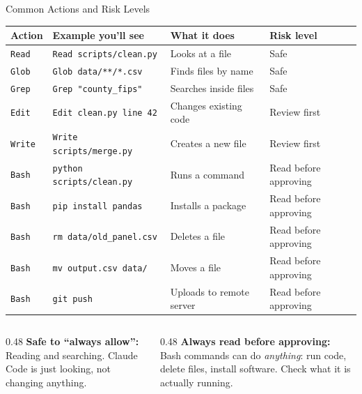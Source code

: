 \documentclass[aspectratio=169, 11pt]{beamer}
\begin{document}
\begin{frame}{Common Actions and Risk Levels}
  \scriptsize
  \begin{tabular*}{\textwidth}{@{\extracolsep{\fill}}llll@{}}
    \toprule
    \textbf{Action} & \textbf{Example you'll see} & \textbf{What it does} & \textbf{Risk level} \\
    \midrule
    \texttt{Read}      & \texttt{Read scripts/clean.py}           & Looks at a file          & \color{green!50!black} Safe \\
    \texttt{Glob}      & \texttt{Glob data/**/*.csv}              & Finds files by name      & \color{green!50!black} Safe \\
    \texttt{Grep}      & \texttt{Grep "county\_fips"}             & Searches inside files    & \color{green!50!black} Safe \\
    \texttt{Edit}      & \texttt{Edit clean.py line 42}           & Changes existing code    & \color{yellow!50!black} Review first \\
    \texttt{Write}     & \texttt{Write scripts/merge.py}          & Creates a new file       & \color{yellow!50!black} Review first \\
    \texttt{Bash}      & \texttt{python scripts/clean.py}         & Runs a command           & \color{red!70!black} Read before approving \\
    \texttt{Bash}      & \texttt{pip install pandas}              & Installs a package       & \color{red!70!black} Read before approving \\
    \texttt{Bash}      & \texttt{rm data/old\_panel.csv}          & Deletes a file           & \color{red!70!black} Read before approving \\
    \texttt{Bash}      & \texttt{mv output.csv data/}             & Moves a file             & \color{red!70!black} Read before approving \\
    \texttt{Bash}      & \texttt{git push}                        & Uploads to remote server & \color{red!70!black} Read before approving \\
    \bottomrule
  \end{tabular*}

  \normalsize
  \vspace{0.5em}
  \begin{columns}[T]
    \begin{column}{0.48\textwidth}
      \textbf{\color{green!50!black} Safe to ``always allow'':}\\
      Reading and searching. Claude Code is just looking, not changing anything.
    \end{column}
    \begin{column}{0.48\textwidth}
      \textbf{\color{red!70!black} Always read before approving:}\\
      Bash commands can do \textit{anything}: run code, delete files, install software. Check what it is actually running.
    \end{column}
  \end{columns}
\end{frame}
\end{document}
